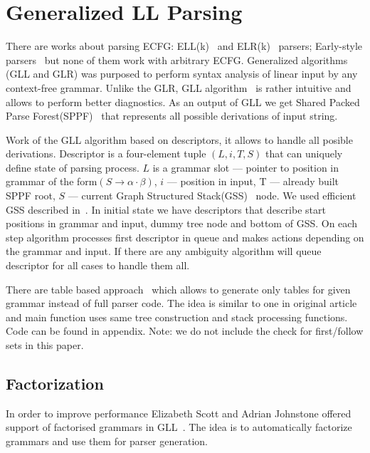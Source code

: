 \documentclass[runningheads,a4paper]{llncs}
\begin{document}
\section{Generalized LL Parsing}%

There are works about parsing ECFG: ELL(k)~\cite{!!!} and ELR(k)~\cite{!!!} parsers;
Early-style parsers~\cite{!!!} but none of them work with arbitrary ECFG.
Generalized algorithms (GLL and GLR) was purposed to perform syntax analysis of linear input by any context-free 
grammar. Unlike the GLR, GLL algorithm~\cite{scott2010gll} is rather intuitive and allows to perform better diagnostics.
As an output of GLL we get Shared Packed Parse Forest(SPPF)~\cite{scott2013gll} that represents all possible derivations of input string.

Work of the GLL algorithm based on descriptors, it allows to handle all posible derivations.
Descriptor is a four-element tuple $(L,i, T, S)$ that can uniquely define state of parsing process. 
$L$ is a grammar slot ---
pointer to position in grammar of the form$(S \to \alpha \cdot \beta)$, $i$ --- position in input,
T --- already built SPPF root, $S$ --- current Graph Structured Stack(GSS)~\cite{GSS} node.
We used efficient GSS described in~\cite{afroozeh2015faster}.
In initial state we have descriptors that describe start positions in grammar and input, dummy tree node and bottom of GSS.
On each step algorithm processes first descriptor in queue and makes actions depending on the grammar and input.
If there are any ambiguity algorithm will queue descriptor for all cases to handle them all. 

There are table based approach~\cite{ragozina} which allows to generate only tables for given grammar instead of full parser code.
The idea is similar to one in original article and main function uses same tree construction and stack processing functions.
Code can be found in appendix. Note: we do not include the check for first/follow sets in this paper.

\subsection{Factorization}%

In order to improve performance Elizabeth Scott and Adrian Johnstone offered support of factorised grammars in GLL~\cite{scott2016structuring}. 
The idea is to automatically factorize grammars and use them for parser generation. 
\end{document}

